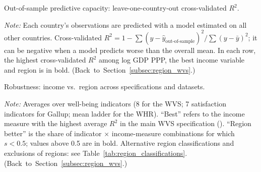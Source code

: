 \documentclass[12pt]{article}
\begin{document}
\begin{table}[htbp]
    \centering
    \caption{Out-of-sample predictive capacity: leave-one-country-out cross-validated $R^2$.}\label{tab:cv}
    \begin{adjustbox}{max width=\textwidth}
    
    \end{adjustbox}
    \begin{minipage}{\textwidth}\footnotesize \textit{Note:} Each country's observations are predicted with a model estimated on all other countries. Cross-validated $R^2 = 1 - \sum (y - \hat y_{\text{out-of-sample}})^2 / \sum (y - \bar y)^2$; it can be negative when a model predicts worse than the overall mean. In each row, the highest cross-validated $R^2$ among log GDP PPP, the best income variable and region is in bold. \hfill(Back~to~Section~\ref{subsec:region_wvs}.)\end{minipage}
\end{table}

\begin{table}[htbp]
    \centering
    \caption{Robustness: income vs.\ region across specifications and datasets.}\label{tab:robustness}
    \begin{adjustbox}{max width=\textwidth}
    
    \end{adjustbox}
    \begin{minipage}{\textwidth}\footnotesize \textit{Note:} Averages over well-being indicators (8 for the WVS; 7 satisfaction indicators for Gallup; mean ladder for the WHR). ``Best'' refers to the income measure with the highest average $R^2$ in the main WVS specification (\bestIncome). ``Region better'' is the share of indicator $\times$ income-measure combinations for which $s < 0.5$; values above 0.5 are in bold. Alternative region classifications and exclusions of regions: see Table~\ref{tab:region_classifications}. \hfill(Back~to~Section~\ref{subsec:region_wvs}.)\end{minipage}
\end{table}
\end{document}
